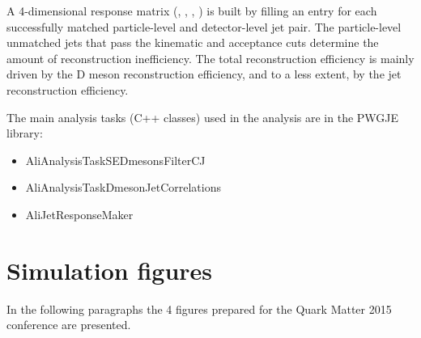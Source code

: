 A 4-dimensional response matrix (\zpargen, \ptchjetgen, \zpardet, \ptchjetdet) is built by filling an entry for each successfully 
matched particle-level and detector-level jet pair. The particle-level unmatched jets that pass the kinematic and acceptance cuts
determine the amount of reconstruction inefficiency. The total reconstruction efficiency is mainly driven by
the D meson reconstruction efficiency, and to a less extent, by the jet reconstruction efficiency.

The main analysis tasks (C++ classes) used in the analysis are in the PWGJE library:
\begin{itemize}
\item AliAnalysisTaskSEDmesonsFilterCJ
\item AliAnalysisTaskDmesonJetCorrelations
\item AliJetResponseMaker
\end{itemize}
\section{Simulation figures}
In the following paragraphs the 4 figures prepared for the Quark Matter 2015 conference are presented.
